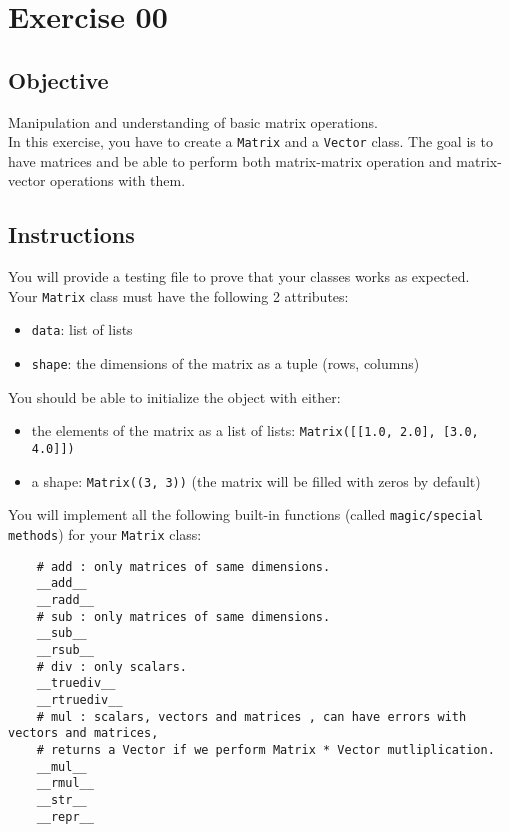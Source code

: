 \chapter{Exercise 00}
\makeheaderfilesforbidden

\section*{Objective}
Manipulation and understanding of basic matrix operations.\\
In this exercise, you have to create a \texttt{Matrix} and a \texttt{Vector} class.
The goal is to have matrices and be able to perform both matrix-matrix operation
and matrix-vector operations with them.

\section*{Instructions}
You will provide a testing file to prove that your classes works as expected.\\

Your \texttt{Matrix} class must have the following 2 attributes: 
\begin{itemize}
  \item \texttt{data}: list of lists
  \item \texttt{shape}: the dimensions of the matrix as a tuple (rows, columns)
\end{itemize}

You should be able to initialize the object with either:
\begin{itemize}
  \item the elements of the matrix as a list of lists: \texttt{Matrix([[1.0, 2.0], [3.0, 4.0]])}
  \item a shape: \texttt{Matrix((3, 3))} (the matrix will be filled with zeros by default)
\end{itemize}

You will implement all the following built-in functions (called \texttt{magic/special methods}) for your \texttt{Matrix} class:

\begin{verbatim}
    # add : only matrices of same dimensions.
    __add__
    __radd__
    # sub : only matrices of same dimensions.
    __sub__
    __rsub__
    # div : only scalars.
    __truediv__
    __rtruediv__
    # mul : scalars, vectors and matrices , can have errors with vectors and matrices, 
    # returns a Vector if we perform Matrix * Vector mutliplication.
    __mul__
    __rmul__
    __str__
    __repr__
\end{verbatim}

